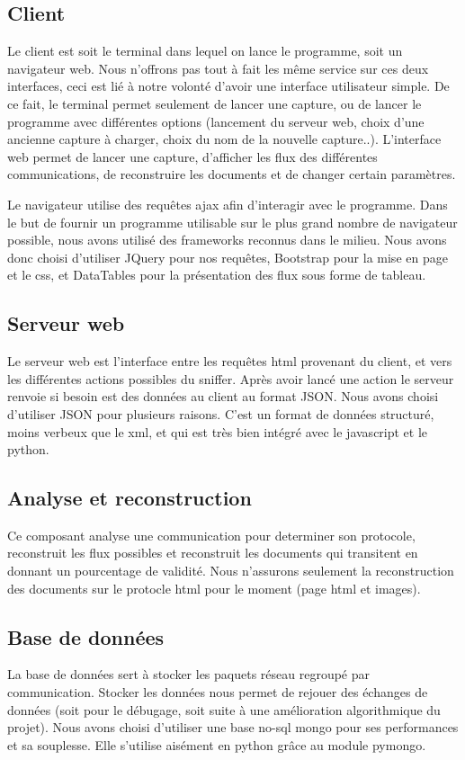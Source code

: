\subsection{Client}
Le client est soit le terminal dans lequel on lance le programme, soit un navigateur web. Nous n'offrons pas tout à fait les même service sur ces deux interfaces, ceci est lié à notre volonté d'avoir une interface utilisateur simple. 
De ce fait, le terminal permet seulement de lancer une capture, ou de lancer le programme avec différentes options (lancement du serveur web, choix d'une ancienne capture à charger, choix du nom de la nouvelle capture..).
L'interface web permet de lancer une capture, d'afficher les flux des différentes communications, de reconstruire les documents et de changer certain paramètres.

Le navigateur utilise des requêtes ajax afin d'interagir avec  le programme.
Dans le but de fournir un programme utilisable sur le plus grand nombre de navigateur possible, nous avons utilisé des frameworks reconnus dans le milieu. Nous avons donc choisi d'utiliser JQuery pour nos requêtes, Bootstrap pour la mise en page et le css, et DataTables pour la présentation des flux sous forme de tableau. 

\subsection{Serveur web}
Le serveur web est l'interface entre les requêtes html provenant du client, et vers les différentes actions possibles du sniffer. Après avoir lancé une action le serveur renvoie si besoin est des données au client au format
JSON.
Nous avons choisi d'utiliser JSON pour plusieurs raisons. C'est un format de données structuré, moins verbeux que le xml, et qui est très bien intégré avec le javascript et le python. 

\subsection{Analyse et reconstruction}
Ce composant analyse une communication pour determiner son protocole, reconstruit les flux possibles et reconstruit les documents qui transitent en donnant un pourcentage de validité. Nous n'assurons seulement la reconstruction des documents sur le protocle html pour le moment (page html et images).

\subsection{Base de données}
La base de données sert à stocker les paquets réseau regroupé par communication.	Stocker les données nous permet de rejouer des échanges de données (soit pour le débugage, soit suite à une amélioration algorithmique du projet).	
Nous avons choisi d'utiliser une base no-sql mongo pour ses performances et sa souplesse. Elle s'utilise aisément en python grâce au module pymongo.

